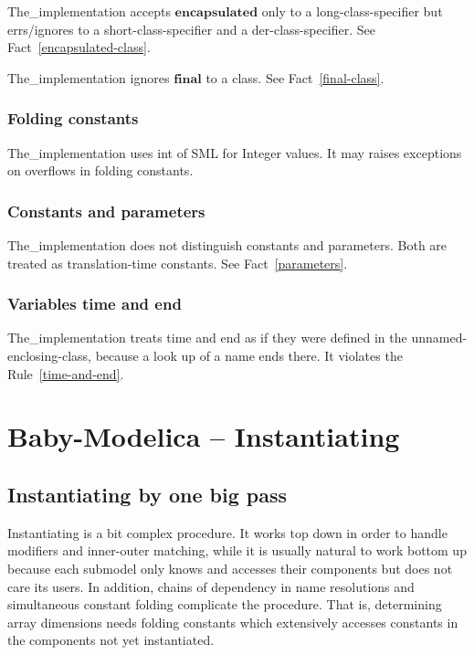\documentclass[10pt,b5paper]{article}
\begin{document}
The_implementation accepts $\mathbf{encapsulated}$ only to a
long-class-specifier but errs/ignores to a short-class-specifier and a
der-class-specifier.  See Fact~\ref{encapsulated-class}.

The_implementation ignores $\mathbf{final}$ to a class.  See
Fact~\ref{final-class}.

\subsubsection*{Folding constants}

The_implementation uses int of SML for Integer values.  It may raises
exceptions on overflows in folding constants.

\subsubsection*{Constants and parameters}

The_implementation does not distinguish constants and parameters.
Both are treated as translation-time constants.  See
Fact~\ref{parameters}.

\subsubsection*{Variables {time} and {end}}

The_implementation treats {time} and {end} as if they were defined in
the unnamed-enclosing-class, because a look up of a name ends there.
It violates the Rule~\ref{time-and-end}.


\section{Baby-Modelica -- Instantiating}


\subsection{Instantiating by one big pass}

{Instantiating} is a bit complex procedure.  It works top down in
order to handle modifiers and inner-outer matching, while it is
usually natural to work bottom up because each submodel only knows and
accesses their components but does not care its users.  In addition,
chains of dependency in name resolutions and simultaneous constant
folding complicate the procedure.  That is, determining array
dimensions needs folding constants which extensively accesses
constants in the components not yet instantiated.
\end{document}
